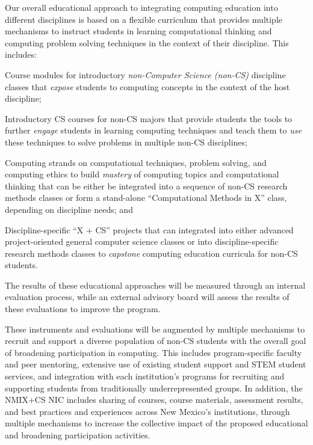 Our overall educational approach to integrating computing education into different disciplines is based on a flexible curriculum that provides multiple mechanisms to instruct students in learning computational thinking and computing problem solving techniques in the context of their discipline. This includes:
\begin{tightitemize}
\item Course modules for introductory \emph{non-Computer Science (non-CS)} discipline classes that \emph{expose} students to computing concepts
  in the context of the host discipline;
\item Introductory CS courses for non-CS majors that provide students the tools to further \emph{engage} students in learning  computing techniques and teach them to \emph{use} these techniques to solve problems in multiple non-CS disciplines;
\item Computing strands on computational techniques, problem solving, and computing ethics  to build \emph{mastery} of computing topics and computational thinking that can be either be integrated into a sequence of non-CS research methods classes or form a stand-alone ``Computational Methods in X'' class, depending on discipline needs; and
\item Discipline-specific ``X + CS'' projects that can integrated into either advanced project-oriented general computer science classes or into discipline-specific  research methods classes to \emph{capstone} computing education
  curricula for non-CS students.
\end{tightitemize}
The results of these educational approaches will be measured through an internal evaluation process, while an external advisory board will assess the results of these evaluations to improve the program.

These instruments and evaluations will be augmented by multiple mechanisms to recruit and support a diverse population of non-CS students with the overall goal of broadening participation in computing. This includes program-specific faculty and peer mentoring, extensive use of existing student support and STEM student services, and integration with each institution's programs for recruiting and supporting students from traditionally underrepresented groups. In addition, the NMIX+CS NIC includes sharing of courses,
course materials, assessment results, and best practices and experiences across New Mexico's institutions, through multiple mechanisms to increase the collective impact of the proposed educational and broadening participation activities.

